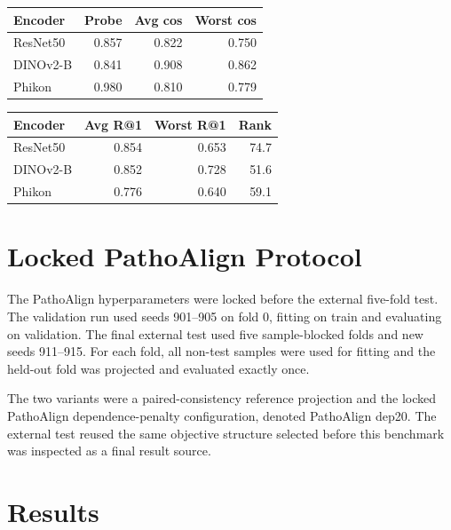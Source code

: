 \documentclass[10pt]{article}
\begin{document}
\begin{center}
\begin{minipage}{0.98\linewidth}
\centering
{}
\label{tab:encoder-triage}
\small
\begin{tabular}{lrrr}
\toprule
Encoder & Probe & Avg cos & Worst cos \\
\midrule
ResNet50 & 0.857 & 0.822 & 0.750 \\
DINOv2-B & 0.841 & 0.908 & 0.862 \\
Phikon & 0.980 & 0.810 & 0.779 \\
\bottomrule
\end{tabular}

\vspace{0.25em}

\begin{tabular}{lrrr}
\toprule
Encoder & Avg R@1 & Worst R@1 & Rank \\
\midrule
ResNet50 & 0.854 & 0.653 & 74.7 \\
DINOv2-B & 0.852 & 0.728 & 51.6 \\
Phikon & 0.776 & 0.640 & 59.1 \\
\bottomrule
\end{tabular}
\end{minipage}
\end{center}

\section{Locked PathoAlign Protocol}

The PathoAlign hyperparameters were locked before the external five-fold test. The validation run used seeds 901--905 on fold 0, fitting on train and evaluating on validation. The final external test used five sample-blocked folds and new seeds 911--915. For each fold, all non-test samples were used for fitting and the held-out fold was projected and evaluated exactly once.

The two variants were a paired-consistency reference projection and the locked PathoAlign dependence-penalty configuration, denoted PathoAlign dep20. The external test reused the same objective structure selected before this benchmark was inspected as a final result source.

\section{Results}
\end{document}
